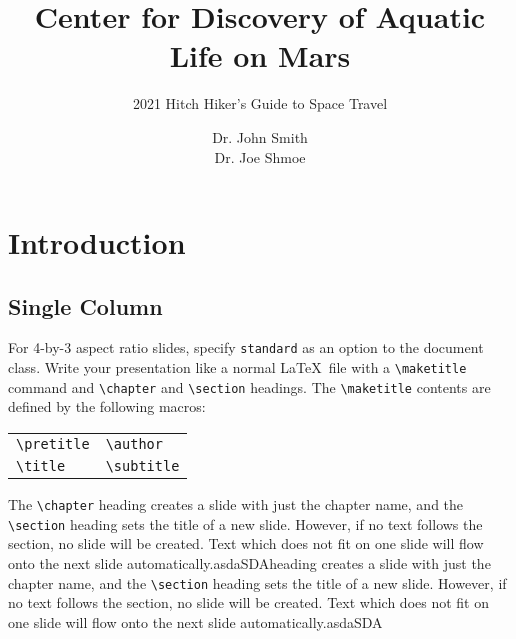 \documentclass{antclass}
\title{Center for Discovery of Aquatic Life on Mars}
\subtitle{2021 Hitch Hiker's Guide to Space Travel}
\author{Dr. John Smith\\ Dr. Joe Shmoe}
\begin{document}
\maketitle

\chapter{Introduction}

\section{Single Column}

For 4-by-3 aspect ratio slides, specify \verb|standard| as an option to the
document class. Write your presentation like a normal \LaTeX\ file with a
\verb|\maketitle| command and \verb|\chapter| and \verb|\section| headings. The
\verb|\maketitle| contents are defined by the following macros:
\begin{center}
  \begin{tabular}{l@{\qquad}l}
    \verb|\pretitle| &
    \verb|\author|     \\
    \verb|\title|    &
    \verb|\subtitle|
  \end{tabular}
\end{center}
The \verb|\chapter| heading creates a slide with just the chapter name, and the
\verb|\section| heading sets the title of a new slide. However, if no text
follows the section, no slide will be created. Text which does not fit on one
slide will flow onto the next slide automatically.asdaSDAheading creates a slide with just the chapter name, and the
\verb|\section| heading sets the title of a new slide. However, if no text
follows the section, no slide will be created. Text which does not fit on one
slide will flow onto the next slide automatically.asdaSDA
\end{document}
